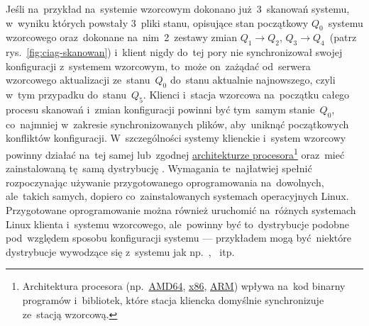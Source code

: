 \documentclass[thesis]{subfiles}
\begin{document}
Jeśli na~przykład na~systemie wzorcowym dokonano już~3~skanowań systemu, w~wyniku których powstały 3~pliki stanu, opisujące stan początkowy $Q_0$~systemu wzorcowego oraz~dokonane na~nim~2~zestawy zmian $Q_1\rightarrow Q_2$, $Q_3\rightarrow Q_4$~(patrz rys.~\ref{fig:ciag-skanowan}) i~klient nigdy do~tej pory nie synchronizował swojej konfiguracji z~systemem wzorcowym, to~może on~zażądać od~serwera wzorcowego aktualizacji ze~stanu~$Q_0$ do~stanu aktualnie najnowszego, czyli w~tym przypadku do~stanu~$Q_5$. Klienci i~stacja wzorcowa na~początku całego procesu skanowań i~zmian konfiguracji powinni być tym~samym stanie~$Q_0$, co~najmniej w~zakresie synchronizowanych plików, aby~uniknąć początkowych konfliktów konfiguracji. W~szczególności systemy klienckie i~system wzorcowy powinny działać na~tej samej lub~zgodnej \href{https://en.wikipedia.org/wiki/List_of_instruction_sets}{architekturze procesora}\footnote{Architektura procesora (np.~\href{https://en.wikipedia.org/wiki/X86-64}{AMD64}, \href{https://en.wikipedia.org/wiki/X86}{x86}, \href{https://en.wikipedia.org/wiki/ARM_architecture}{ARM}) wpływa na~kod binarny programów i~bibliotek, które stacja kliencka domyślnie synchronizuje ze~stacją wzorcową.} oraz~mieć zainstalowaną tę~samą dystrybucję . Wymagania te~najłatwiej spełnić rozpoczynając używanie przygotowanego oprogramowania na~dowolnych, ale~takich samych, dopiero co~zainstalowanych systemach operacyjnych Linux. Przygotowane oprogramowanie można również uruchomić na~różnych systemach Linux klienta i~systemu wzorcowego, ale~powinny być to~dystrybucje podobne pod~względem sposobu konfiguracji systemu --- przykładem mogą być~niektóre dystrybucje wywodzące się z~systemu  jak np.~, ~itp.
\end{document}
